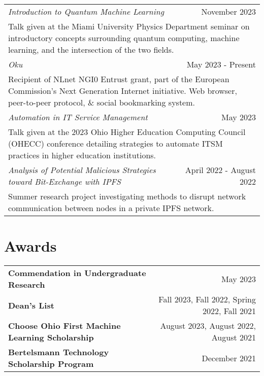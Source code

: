\documentclass[letterpaper,8pt]{article} %
\begin{document}
\begin{tabular*}{\linewidth}{@{\extracolsep{\fill}} lr }
\emph{Introduction to Quantum Machine Learning} & November 2023\\
\multicolumn{2}{p{\linewidth}}{Talk given at the Miami University Physics Department seminar on introductory concepts surrounding quantum computing, machine learning, and the intersection of the two fields.}\\
\emph{Oku} & May 2023 - Present\\
\multicolumn{2}{p{\linewidth}}{Recipient of NLnet NGI0 Entrust grant, part of the European Commission's Next Generation Internet initiative. Web browser, peer-to-peer protocol, \& social bookmarking system.}\\
\emph{Automation in IT Service Management} & May 2023\\
\multicolumn{2}{p{\linewidth}}{Talk given at the 2023 Ohio Higher Education Computing Council (OHECC) conference detailing strategies to automate ITSM practices in higher education institutions.}\\
\emph{Analysis of Potential Malicious Strategies toward Bit-Exchange with IPFS} & April 2022 - August 2022\\
\multicolumn{2}{p{\linewidth}}{Summer research project investigating methods to disrupt network communication between nodes in a private IPFS network.}\\
\end{tabular*}

\section{Awards}

\begin{tabular*}{\linewidth}{@{\extracolsep{\fill}} lr }
\textbf{Commendation in Undergraduate Research} & May 2023\\
\textbf{Dean's List} & Fall 2023, Fall 2022, Spring 2022, Fall 2021\\
\textbf{Choose Ohio First Machine Learning Scholarship} & August 2023, August 2022, August 2021\\
\textbf{Bertelsmann Technology Scholarship Program} & December 2021
\end{tabular*}
\end{document}
